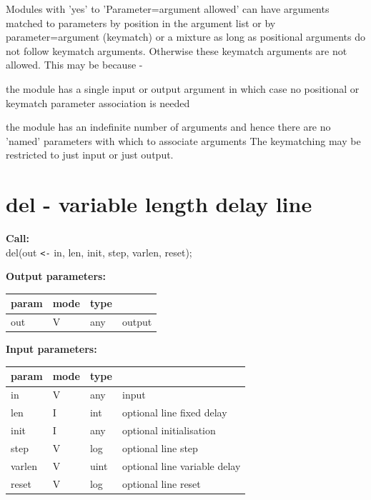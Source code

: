     Modules with 'yes' to 'Parameter=argument allowed' can have arguments
    matched to parameters by position in the argument list or by
    parameter=argument (keymatch) or a mixture as long as positional arguments
    do not follow keymatch arguments. Otherwise these keymatch arguments are
    not allowed. This may be because - \\
    \blist
    \item   the module has a single input or output argument in which case
    no positional or keymatch parameter association is needed
    \item   the module has an indefinite number of arguments and hence there
    are no 'named' parameters with which to associate arguments
    \blend
    The keymatching may be restricted to just input or just output.


    \section{del - variable length delay line}\label{sec:imdel}
        
        {\bf Call:} \\
        del(out \verb'<-' in, len, init, step, varlen, reset);
        
        {\bf Output parameters:} \\
        \begin{tabular}{| l | l | l | l |}
        \hline
        param  & mode & type  & \\
        \hline \hline
        out  & V & any & output \\ \hline
        \end{tabular}
        
        {\bf Input parameters:} \\
        \begin{tabular}{| l | l | l | l |}
        \hline
        param  & mode & type  & \\
        \hline \hline
        in     & V & any  & input          \\ \hline
        len    & I & int  & optional line fixed delay \\ \hline
        init   & I & any  & optional initialisation \\ \hline
        step   & V & log  & optional line step \\ \hline
        varlen & V & uint & optional line variable delay \\ \hline
        reset  & V & log  & optional line reset \\ \hline
        \end{tabular}
        
